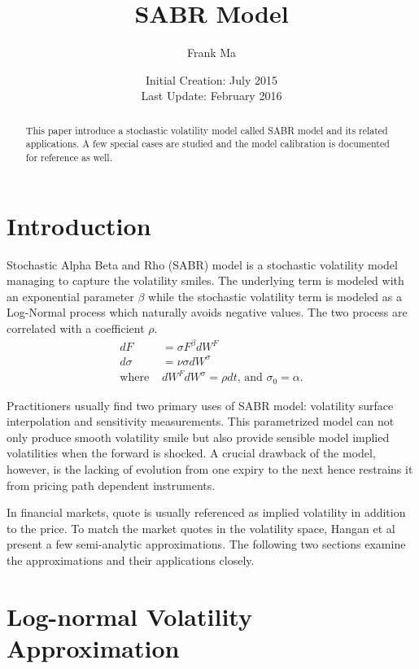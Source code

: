 \documentclass{article}
\title{SABR Model}
\author{Frank Ma}
\date{Initial Creation: July 2015 \\ Last Update: February 2016}
\begin{document}
\maketitle

\begin{abstract}
    This paper introduce a stochastic volatility model called SABR model and its related applications.
    A few special cases are studied and the model calibration is documented for reference as well.
\end{abstract}

\section{Introduction}

Stochastic Alpha Beta and Rho (SABR) model is a stochastic volatility model managing to capture the volatility smiles.
The underlying term is modeled with an exponential parameter $ \beta $ while the stochastic volatility term is modeled as a Log-Normal process which naturally avoids negative values.
The two process are correlated with a coefficient $ \rho $.
\begin{align}
    d F &= \sigma F^{\beta} d W^F \\
    d \sigma &= \nu \sigma d W^{\sigma} \\
    \text{where } & d W^F d W^{\sigma} = \rho d t \text{, and } {\sigma}_0 = \alpha \text{.}\nonumber
\end{align}

Practitioners usually find two primary uses of SABR model: volatility surface interpolation and sensitivity measurements.
This parametrized model can not only produce smooth volatility smile but also provide sensible model implied volatilities when the forward is shocked.
A crucial drawback of the model, however, is the lacking of evolution from one expiry to the next hence restrains it from pricing path dependent instruments.

In financial markets, quote is usually referenced as implied volatility in addition to the price.
To match the market quotes in the volatility space, Hangan et al \cite{Managing Smile Risk} present a few semi-analytic approximations.
The following two sections examine the approximations and their applications closely.


\section{Log-normal Volatility Approximation}
\end{document}
